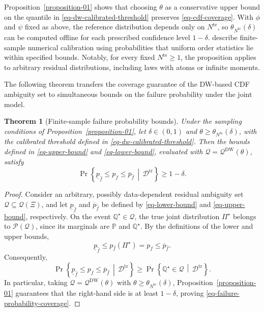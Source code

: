 \documentclass[review,11pt,3p,authoryear,nopreprintline]{elsarticle}
\newtheorem{theorem}{Theorem}
\begin{document}
Proposition~\ref{proposition-01} shows that choosing $\theta$ as a conservative upper bound on the quantile in \eqref{eq-dw-calibrated-threshold} preserves \eqref{eq-cdf-coverage}. With $\phi$ and $\psi$ fixed as above, the reference distribution depends only on $N^{\mathrm{te}}$, so $\theta_{N^{\mathrm{te}}}(\delta)$ can be computed offline for each prescribed confidence level $1-\delta$. \citet{L.J23} describe finite-sample numerical calibration using probabilities that uniform order statistics lie within specified bounds. Notably, for every fixed $N^{\mathrm{te}}\ge1$, the proposition applies to arbitrary residual distributions, including laws with atoms or infinite moments.

The following theorem transfers the coverage guarantee of the DW-based CDF ambiguity set to simultaneous bounds on the failure probability under the joint model.

\begin{theorem}[Finite-sample failure probability bounds]
  \label{theorem-01}
  Under the sampling conditions of Proposition~\ref{proposition-01}, let $\delta\in(0,1)$ and $\theta\ge\theta_{N^{\mathrm{te}}}(\delta)$, with the calibrated threshold defined in \eqref{eq-dw-calibrated-threshold}. Then the bounds defined in \eqref{eq-upper-bound} and \eqref{eq-lower-bound}, evaluated with $\mathscr Q=\mathscr Q^{\mathrm{DW}}(\theta)$, satisfy
  \begin{equation}
    \Pr\left\{\underline p_{\hat f}\le p_f\le\overline p_{\hat f}\,\middle|\,\mathcal D^{\mathrm{tr}}\right\}\ge1-\delta.
    \label{eq-failure-probability-coverage}
  \end{equation}
\end{theorem}

\begin{proof}
  Consider an arbitrary, possibly data-dependent residual ambiguity set $\mathscr Q\subseteq\mathcal Q(\Xi)$, and let $\underline p_{\hat f}$ and $\overline p_{\hat f}$ be defined by \eqref{eq-lower-bound} and \eqref{eq-upper-bound}, respectively. On the event $\mathbb Q^\star\in\mathscr Q$, the true joint distribution $\Pi^\star$ belongs to $\mathscr P(\mathscr Q)$, since its marginals are $\mathbb P$ and $\mathbb Q^\star$. By the definitions of the lower and upper bounds,
  \[
    \underline p_{\hat f}
    \le p_{\hat f}(\Pi^\star)
    =p_f
    \le\overline p_{\hat f}.
  \]
  Consequently,
  \[
    \Pr\left\{
      \underline p_{\hat f}\le p_f\le\overline p_{\hat f}
      \,\middle|\,\mathcal D^{\mathrm{tr}}
    \right\}
    \ge
    \Pr\left\{
      \mathbb Q^\star\in\mathscr Q
      \,\middle|\,\mathcal D^{\mathrm{tr}}
    \right\}.
  \]
  In particular, taking $\mathscr Q=\mathscr Q^{\mathrm{DW}}(\theta)$ with $\theta\ge\theta_{N^{\mathrm{te}}}(\delta)$, Proposition~\ref{proposition-01} guarantees that the right-hand side is at least $1-\delta$, proving \eqref{eq-failure-probability-coverage}.
\end{proof}
\end{document}

